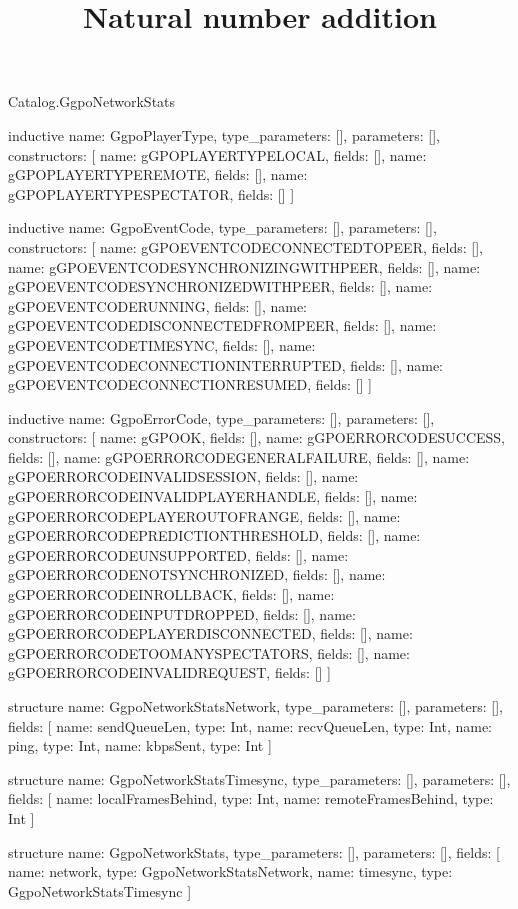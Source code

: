 \begin{lexlean}{Catalog.GgpoNetworkStats}
\title{Natural number addition}
\begin{semanticmodule}
inductive{
  name: GgpoPlayerType,
  type_parameters: [],
  parameters: [],
  constructors: [
    {name: gGPOPLAYERTYPELOCAL, fields: []},
    {name: gGPOPLAYERTYPEREMOTE, fields: []},
    {name: gGPOPLAYERTYPESPECTATOR, fields: []}
  ]
}

inductive{
  name: GgpoEventCode,
  type_parameters: [],
  parameters: [],
  constructors: [
    {name: gGPOEVENTCODECONNECTEDTOPEER, fields: []},
    {name: gGPOEVENTCODESYNCHRONIZINGWITHPEER, fields: []},
    {name: gGPOEVENTCODESYNCHRONIZEDWITHPEER, fields: []},
    {name: gGPOEVENTCODERUNNING, fields: []},
    {name: gGPOEVENTCODEDISCONNECTEDFROMPEER, fields: []},
    {name: gGPOEVENTCODETIMESYNC, fields: []},
    {name: gGPOEVENTCODECONNECTIONINTERRUPTED, fields: []},
    {name: gGPOEVENTCODECONNECTIONRESUMED, fields: []}
  ]
}

inductive{
  name: GgpoErrorCode,
  type_parameters: [],
  parameters: [],
  constructors: [
    {name: gGPOOK, fields: []},
    {name: gGPOERRORCODESUCCESS, fields: []},
    {name: gGPOERRORCODEGENERALFAILURE, fields: []},
    {name: gGPOERRORCODEINVALIDSESSION, fields: []},
    {name: gGPOERRORCODEINVALIDPLAYERHANDLE, fields: []},
    {name: gGPOERRORCODEPLAYEROUTOFRANGE, fields: []},
    {name: gGPOERRORCODEPREDICTIONTHRESHOLD, fields: []},
    {name: gGPOERRORCODEUNSUPPORTED, fields: []},
    {name: gGPOERRORCODENOTSYNCHRONIZED, fields: []},
    {name: gGPOERRORCODEINROLLBACK, fields: []},
    {name: gGPOERRORCODEINPUTDROPPED, fields: []},
    {name: gGPOERRORCODEPLAYERDISCONNECTED, fields: []},
    {name: gGPOERRORCODETOOMANYSPECTATORS, fields: []},
    {name: gGPOERRORCODEINVALIDREQUEST, fields: []}
  ]
}

structure{
  name: GgpoNetworkStatsNetwork,
  type_parameters: [],
  parameters: [],
  fields: [
    {name: sendQueueLen, type: Int},
    {name: recvQueueLen, type: Int},
    {name: ping, type: Int},
    {name: kbpsSent, type: Int}
  ]
}

structure{
  name: GgpoNetworkStatsTimesync,
  type_parameters: [],
  parameters: [],
  fields: [
    {name: localFramesBehind, type: Int},
    {name: remoteFramesBehind, type: Int}
  ]
}

structure{
  name: GgpoNetworkStats,
  type_parameters: [],
  parameters: [],
  fields: [
    {name: network, type: GgpoNetworkStatsNetwork},
    {name: timesync, type: GgpoNetworkStatsTimesync}
  ]
}
\end{semanticmodule}
\end{lexlean}
